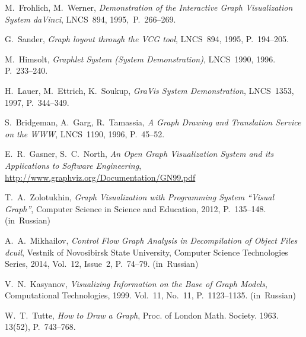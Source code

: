 \documentclass[conference]{IEEEtran}
\begin{document}

%
%
%
\begin{thebibliography}{9}

 M.~Frohlich, M.~Werner, \emph{Demonstration of the Interactive Graph Visualization System daVinci}, LNCS~894, 1995,~P.~266--269.

 G.~Sander, \emph{Graph loyout through the VCG tool}, LNCS~894, 1995, P.~194--205.

 M.~Himsolt, \emph{Graphlet System (System Demonstration)}, LNCS~1990, 1996. P.~233--240.

 H.~Lauer, M.~Ettrich, K.~Soukup, \emph{GraVis System Demonstration}, LNCS~1353, 1997, P.~344--349.

 S.~Bridgeman, A.~Garg, R.~Tamassia, \emph{A Graph Drawing and Translation Service on the WWW}, LNCS~1190, 1996, P.~45--52.

 E.~R.~Gasner, S.~C.~North, \emph{An Open Graph Visualization System and its Applications to Software Engineering}, \url{http://www.graphviz.org/Documentation/GN99.pdf}

 T.~A.~Zolotukhin, \emph{Graph Visualization with Programming System ``Visual Graph''}, Computer Science in Science and Education, 2012, P.~135--148. (in~Russian)

 A.~A.~Mikhailov, \emph{Control Flow Graph Analysis in Decompilation of Object Files dcuil}, Vestnik of Novosibirsk State University, Computer Science Technologies Series, 2014, Vol.~12, Issue~2, P.~74--79. (in~Russian)

 V.~N.~Kasyanov, \emph{Visualizing Information on the Base of Graph Models}, Computational Technologies, 1999. Vol.~11, No.~11, P.~1123--1135. (in~Russian)

 W.~T.~Tutte, \emph{How to Draw a Graph}, Proc. of London Math. Society. 1963. 13(52),  P.~743--768.


\end{thebibliography}
\end{document}
